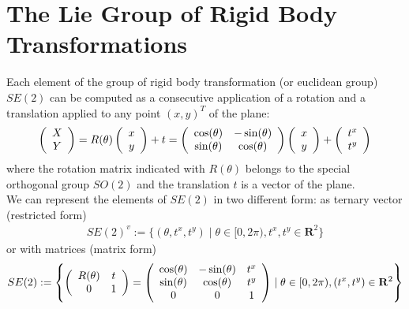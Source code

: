\section{The Lie Group of Rigid Body Transformations}\label{se:rigid_body_transformations}
Each element of the group of rigid body transformation (or euclidean group) $SE(2)$ can be computed as a consecutive application of a rotation and a translation applied to any point $(x,y)^T$ of the plane:
\begin{align*}
\left (  
\begin{array} {c }
X \\
Y
\end{array}
\right )  
= 
R(\theta)
\left (  
\begin{array} {c }
x \\
y
\end{array}
\right ) 
+
t
=
\left (
\begin{array} {c c }
\cos(\theta) & - \sin(\theta) \\
\sin(\theta) & \cos(\theta) 
\end{array}
\right )
\left (  
\begin{array} {c }
x \\
y
\end{array}
\right ) 
+
\left (  
\begin{array} {c }
t^x \\
t^y
\end{array}
\right ) 
\end{align*}
where the rotation matrix indicated with $R(\theta)$ belongs to the special orthogonal group $SO(2)$ and the translation $t$ is a vector of the plane.\\
We can represent the elements of $SE(2)$ in two different form: as ternary vector (restricted form) 
\begin{align*}
SE(2)^{v} 
:=
\{ (\theta, t^x, t^y) \mid \theta \in [0, 2\pi),   t^x, t^y \in\mathbf{R}^2  \}
\end{align*}
or with matrices (matrix form)
\begin{align*}
SE(2) 
:= 
\left \{
\left (
\begin{array} {c c }
R(\theta) & t \\
0 & 1 
\end{array}
\right )
=
\left (
\begin{array} {c c c }
\cos(\theta) & - \sin(\theta)& t^{x} \\
\sin(\theta) & \cos(\theta) & t^{y}\\
0 & 0 &  1
\end{array}
\right )
\mid
\theta \in  [0, 2\pi), (t^x, t^y) \in\mathbf{R}^2
\right \}
\end{align*}
